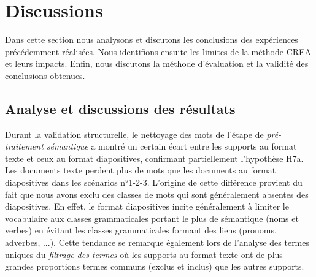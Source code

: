 
\section{Discussions}
\label{section:Evaluation:Discussions}

Dans cette section nous analysons et discutons les conclusions des expériences précédemment réalisées.
Nous identifions ensuite les limites de la méthode CREA et leurs impacts.
Enfin, nous discutons la méthode d'évaluation et la validité des conclusions obtenues.



\subsection{Analyse et discussions des résultats}
\label{subsection:Evaluation:Discussions:DiscussionsResultats}


Durant la validation structurelle, le nettoyage des mots de l'étape de \textit{pré-traitement sémantique} a montré un certain écart entre les supports au format texte et ceux au format diapositives, confirmant partiellement l'hypothèse H7a.
Les documents texte perdent plus de mots que les documents au format diapositives dans les scénarios n°1-2-3.
L'origine de cette différence provient du fait que nous avons exclu des classes de mots qui sont généralement absentes des diapositives.
En effet, le format diapositives incite généralement à limiter le vocabulaire aux classes grammaticales portant le plus de sémantique (noms et verbes) en évitant les classes grammaticales formant des liens (pronoms, adverbes, ...).
Cette tendance se remarque également lors de l'analyse des termes uniques du \textit{filtrage des termes} où les supports au format texte ont de plus grandes proportions termes communs (exclus et inclus) que les autres supports.

